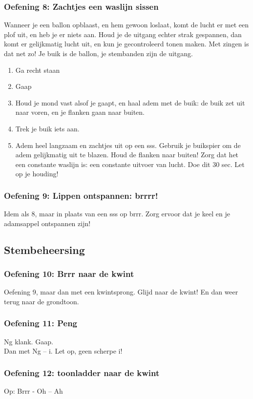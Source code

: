 \begin{enumerate}
\subsubsection*{Oefening 8: Zachtjes een waslijn sissen}
Wanneer je een ballon opblaast, en hem gewoon loslaat, komt de lucht er met een plof uit, en heb je er niets aan. Houd je de uitgang echter strak gespannen, dan komt er gelijkmatig lucht uit, en kun je gecontroleerd tonen maken. Met zingen is dat net zo! Je buik is de ballon, je stembanden zijn de uitgang. 
\begin{enumerate}
\item Ga recht staan
\item Gaap
\item Houd je mond vast alsof je gaapt, en haal adem met de buik: de buik zet uit naar voren, en je flanken gaan naar buiten.
\item Trek je buik iets aan.
\item Adem heel langzaam en zachtjes uit op een sss. Gebruik je buikspier om de adem gelijkmatig uit te blazen. Houd de flanken naar buiten! Zorg dat het een constante waslijn is: een constante uitvoer van lucht. Doe dit 30 sec. Let op je houding!
\end{enumerate}
\subsubsection*{Oefening 9: Lippen ontspannen: brrrr!}
Idem als 8, maar in plaats van een sss op brrr. Zorg ervoor dat je keel en je adamsappel ontspannen zijn!
\subsection*{Stembeheersing}
\subsubsection*{Oefening 10: Brrr naar de kwint}
Oefening 9, maar dan met een kwintsprong. Glijd naar de kwint! En dan weer terug naar de grondtoon. 
\subsubsection*{Oefening 11: Peng}
Ng klank. Gaap.\\
Dan met Ng – i. Let op, geen scherpe i!
\subsubsection*{Oefening 12: toonladder naar de kwint}
Op: Brrr - Oh – Ah

\end{enumerate}
